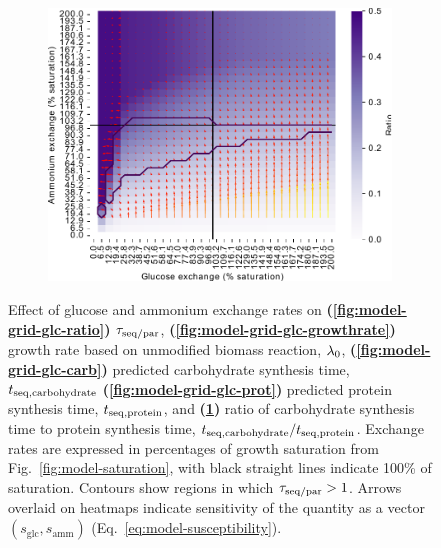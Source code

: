 \begin{figure}
  \begin{subfigure}[t]{0.45\textwidth}
  \centering
    \includegraphics[width=\linewidth]{ec_grid_glc_amm_carb_to_prot}
    \caption{
    }
    \label{fig:model-grid-glc-carb-to-prot}
  \end{subfigure}
  \caption{
    Effect of glucose and ammonium exchange rates on \textbf{(\ref{fig:model-grid-glc-ratio})} $\tau_{\mathrm{seq}/\mathrm{par}}$, \textbf{(\ref{fig:model-grid-glc-growthrate})} growth rate based on unmodified biomass reaction, $\lambda_{0}$, \textbf{(\ref{fig:model-grid-glc-carb})} predicted carbohydrate synthesis time, $t_{\mathrm{seq},\mathrm{carbohydrate}}$ \textbf{(\ref{fig:model-grid-glc-prot})} predicted protein synthesis time, $t_{\mathrm{seq},\mathrm{protein}}$, and \textbf{(\ref{fig:model-grid-glc-carb-to-prot})} ratio of carbohydrate synthesis time to protein synthesis time, $t_{\mathrm{seq},\mathrm{carbohydrate}}/t_{\mathrm{seq},\mathrm{protein}}$.
    Exchange rates are expressed in percentages of growth saturation from Fig.\ \ref{fig:model-saturation}, with black straight lines indicate 100\% of saturation.
    Contours show regions in which $\tau_{\mathrm{seq}/\mathrm{par}} > 1$.
    Arrows overlaid on heatmaps indicate sensitivity of the quantity as a vector $(s_{\mathrm{glc}}, s_{\mathrm{amm}})$ (Eq.\ \ref{eq:model-susceptibility}).
  }
  \label{fig:model-grid-glc}
\end{figure}

